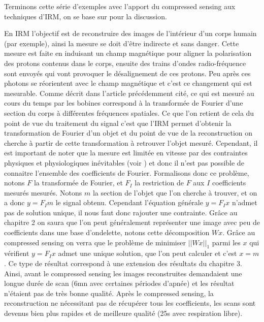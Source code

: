 \begin{exemple}
	Terminons cette série d'exemples avec l'apport du compressed sensing aux techniques d'IRM, on se base sur \cite{LustigCS} pour la discussion. 
	
	En IRM l'objectif est de reconstruire des images de l'intérieur d'un corps humain (par exemple), ainsi la mesure se doit d'être indirecte et sans danger.
	Cette mesure est faite en induisant un champ magnétique pour aligner la polarisation des protons contenus dans le corps, ensuite des trains d'ondes radio-fréquence sont envoyés qui vont provoquer le désalignement de ces protons.
	Peu après ces photons se réorientent avec le champ magnétique et c'est ce changement qui est mesurable.
	Comme décrit dans l'article précédemment cité, ce qui est mesuré au cours du temps par les bobines correspond à la transformée de Fourier d'une section du corps à différentes fréquences spatiales.
	\newline
	Ce que l'on retient de cela du point de vue du traitement du signal c'est que l'IRM permet d'obtenir la transformation de Fourier d'un objet et du point de vue de la reconstruction on cherche à partir de cette transformation à retrouver l'objet mesuré.
	Cependant, il est important de noter que la mesure est limitée en vitesse par des contraintes physiques et physiologiques inévitables (voir \cite{LustigCS}) et donc il n'est pas possible de connaitre l'ensemble des coefficients de Fourier.
	\newline
	Formalisons donc ce problème, notons $F$ la transformée de Fourier, et $F_I$ la restriction de $F$ aux $I$ coefficients mesurés mesurés.
	Notons $m$ la section de l'objet que l'on cherche à trouver, et on a donc $y=F_I m$ le signal obtenu.
	Cependant l'équation générale $y=F_I x$ n'admet pas de solution unique, il nous faut donc rajouter une contrainte.
	Grâce au chapitre 2 on saura que l'on peut généralement représenter une image avec peu de coefficients dans une base d'ondelette, notons cette décomposition $W x$.
	Grâce au compressed sensing on verra que le problème de minimiser $||Wx||_1$ parmi les $x$ qui vérifient $y = F_I x$ admet une unique solution, que l'on peut calculer et c'est $x=m$. 
	Ce type de résultat correspond à une extension des résultats du chapitre 3.
	\newline
	Ainsi, avant le compressed sensing les images reconstruites demandaient une longue durée de scan (6mn avec certaines périodes d'apnée) et les résultat n'étaient pas de très bonne qualité.
	Après le compressed sensing, la reconstruction ne nécessitant pas de récupérer tous les coefficients, les scans sont devenus bien plus rapides et de meilleure qualité (25s avec respiration libre).	
\end{exemple}
